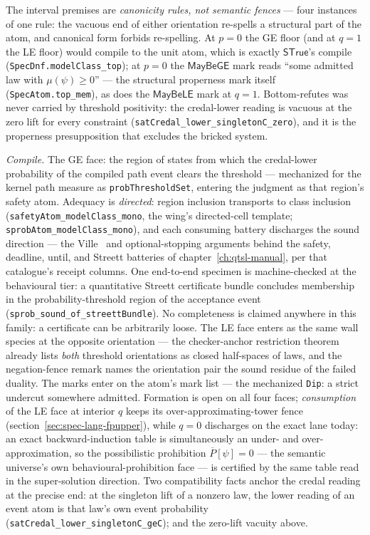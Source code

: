 The interval premises are \emph{canonicity rules, not semantic
fences} --- four instances of one rule: the vacuous end of either
orientation re-spells a structural part of the atom, and canonical
form forbids re-spelling. At $p = 0$ the GE floor (and at $q = 1$
the LE floor) would compile to the unit atom, which is exactly
$\mathsf{STrue}$'s compile (\texttt{SpecDnf.modelClass\_top}); at
$p = 0$ the $\mathsf{MayBeGE}$ mark reads ``some admitted law with
$\mu(\psi) \ge 0$'' --- the structural properness mark itself
(\texttt{SpecAtom.top\_mem}), as does the $\mathsf{MayBeLE}$ mark at
$q = 1$. Bottom-refutes was never carried by threshold positivity:
the credal-lower reading is vacuous at the zero lift for every
constraint (\texttt{satCredal\_lower\_singletonC\_zero}), and it is
the properness presupposition that excludes the bricked system.

\emph{Compile.} The GE face: the region of states from which the
credal-lower probability of the compiled path event clears the
threshold --- mechanized for the kernel path measure as
\texttt{probThresholdSet}, entering the judgment as that region's
safety atom. Adequacy is \emph{directed}: region inclusion
transports to class inclusion
(\texttt{safetyAtom\_modelClass\_mono}, the wing's directed-cell
template; \texttt{sprobAtom\_modelClass\_mono}), and each consuming
battery discharges the sound direction --- the Ville~\cite{ville1939}
and optional-stopping arguments behind the safety, deadline, until,
and Streett batteries of chapter~\ref{ch:qtsl-manual}, per that
catalogue's receipt columns. One end-to-end specimen is
machine-checked at the behavioural tier: a quantitative Streett
certificate bundle concludes membership in the probability-threshold
region of the acceptance event
(\texttt{sprob\_sound\_of\_streettBundle}). No completeness is
claimed anywhere in this family: a certificate can be arbitrarily
loose. The LE face enters as the same wall species at the opposite
orientation --- the checker-anchor restriction theorem already lists
\emph{both} threshold orientations as closed half-spaces of laws, and
the negation-fence remark names the orientation pair the sound
residue of the failed duality. The marks enter on the atom's mark list --- the
mechanized \texttt{Dip}: a strict undercut somewhere admitted.
Formation is open on all four faces; \emph{consumption} of the LE
face at interior $q$ keeps its over-approximating-tower fence
(section~\ref{sec:spec-lang-fpupper}), while $q = 0$ discharges on
the exact lane today: an exact backward-induction table is
simultaneously an under- and over-approximation, so the
possibilistic prohibition $\overline{P}[\psi] = 0$ --- the semantic
universe's own behavioural-prohibition face --- is certified by the
same table read in the super-solution direction. Two compatibility
facts anchor the credal reading at the precise end: at the
singleton lift of a nonzero law, the lower reading of an event atom
is that law's own event probability
(\texttt{satCredal\_lower\_singletonC\_geC}); and the zero-lift
vacuity above.

